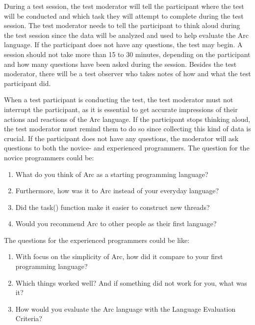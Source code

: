 During a test session, the test moderator will tell the participant where the test will be conducted and which task they will attempt to complete during the test session. The test moderator needs to tell the participant to think aloud during the test session since the data will be analyzed and used to help evaluate the Arc language. If the participant does not have any questions, the test may begin. A session should not take more than 15 to 30 minutes, depending on the participant and how many questions have been asked during the session. Besides the test moderator, there will be a test observer who takes notes of how and what the test participant did.

When a test participant is conducting the test, the test moderator must not interrupt the participant, as it is essential to get accurate impressions of their actions and reactions of the Arc language. If the participant stops thinking aloud, the test moderator must remind them to do so since collecting this kind of data is crucial. If the participant does not have any questions, the moderator will ask questions to both the novice- and experienced programmers. The question for the novice programmers could be:
\begin{enumerate}
    \item What do you think of Arc as a starting programming language?
    \item Furthermore, how was it to Arc instead of your everyday language?
    \item Did the task() function make it easier to construct new threads?
    \item Would you recommend Arc to other people as their first language?
\end{enumerate}

The questions for the experienced programmers could be like:
\begin{enumerate}
    \item With focus on the simplicity of Arc, how did it compare to your first programming language?
    \item Which things worked well? And if something did not work for you, what was it?
    \item How would you evaluate the Arc language with the Language Evaluation Criteria?
\end{enumerate}

